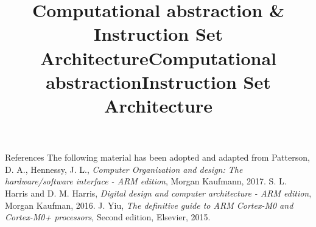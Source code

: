 \documentclass[]{slides}
\title{Computational abstraction \& \\ Instruction Set Architecture}
\begin{document}
\printpdftrue %
\begin{frame} \titlepage \end{frame}


\begin{frame}{References}
The following material has been adopted and adapted from 
\newline
\newline
Patterson, D. A., Hennessy, J. L., \emph{Computer Organization and design: The hardware/software interface - ARM edition}, Morgan Kaufmann, 2017.
\newline
\newline
S. L. Harris and D. M. Harris, \emph{Digital design and computer architecture - ARM edition}, Morgan Kaufman, 2016.
\newline
\newline
J. Yiu, \emph{The definitive guide to ARM Cortex-M0 and Cortex-M0+ processors}, Second edition, Elsevier, 2015.

\end{frame}

\title{Computational abstraction}

\title{Instruction Set Architecture}

\end{document}
